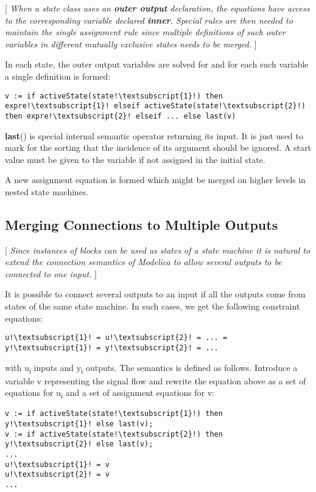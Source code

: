 {[} \emph{When a state class uses an \textbf{outer output} declaration,
the equations have access to the corresponding variable declared
\textbf{inner}. Special rules are then needed to maintain the single
assignment rule since multiple definitions of such outer variables in
different mutually exclusive states needs to be merged.} {]}

In each state, the outer output variables are solved for and for each
such variable a single definition is formed:

\begin{lstlisting}[language=modelica,escapechar=!]
v := if activeState(state!\textsubscript{1}!) then expre!\textsubscript{1}! elseif activeState(state!\textsubscript{2}!) then expre!\textsubscript{2}! elseif ... else last(v)
\end{lstlisting}

\textbf{last}() is special internal semantic operator returning its
input. It is just used to mark for the sorting that the incidence of its
argument should be ignored. A start value must be given to the variable
if not assigned in the initial state.

A new assignment equation is formed which might be merged on higher
levels in nested state machines.

\subsection{Merging Connections to Multiple Outputs}

{[} \emph{Since instances of blocks can be used as states of a state
machine it is natural to extend the connection semantics of Modelica to
allow several outputs to be connected to one input.} {]}

It is possible to connect several outputs to an input if all the outputs
come from states of the same state machine. In such cases, we get the
following constraint equations:

\begin{lstlisting}[language=modelica,escapechar=!]
u!\textsubscript{1}! = u!\textsubscript{2}! = ... = y!\textsubscript{1}! = y!\textsubscript{2}! = ...
\end{lstlisting}
with u\textsubscript{i} inputs and y\textsubscript{i} outputs. The
semantics is defined as follows. Introduce a variable v representing the
signal flow and rewrite the equation above as a set of equations for
u\textsubscript{i} and a set of assignment equations for v:
\begin{lstlisting}[language=modelica,escapechar=!]
v := if activeState(state!\textsubscript{1}!) then y!\textsubscript{1}! else last(v);
v := if activeState(state!\textsubscript{2}!) then y!\textsubscript{2}! else last(v);
...
u!\textsubscript{1}! = v
u!\textsubscript{2}! = v
...
\end{lstlisting}

